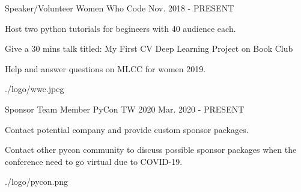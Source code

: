 

\begin{cventries}

  \cventry
    {Speaker/Volunteer} %
    {Women Who Code} %
    {} %
    {Nov. 2018 - PRESENT} %
    {
      \begin{cvitems} %
        \item {Host two python tutorials for begineers with 40 audience each.}
        \item {Give a 30 mins talk titled: My First CV Deep Learning Project on Book Club}
        \item {Help and answer questions on MLCC for women 2019.}
      \end{cvitems}
    }
    {./logo/wwc.jpeg}

  \cventry
    {Sponsor Team Member} %
    {PyCon TW 2020} %
    {} %
    {Mar. 2020 - PRESENT} %
    {
      \begin{cvitems} %
        \item {Contact potential company and provide custom sponsor packages.}
        \item {Contact other pycon community to discuss possible sponsor packages when the conference need to go virtual due to COVID-19.}
      \end{cvitems}
    }
    {./logo/pycon.png}
\end{cventries}
